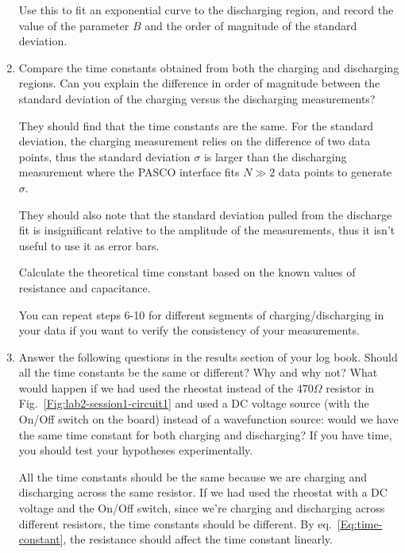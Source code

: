 \documentclass[12pt]{report}
\begin{document}
\begin{enumerate}
Use this to fit an exponential curve to the discharging region, and {\color{blue} record the value of the parameter $B$ and the order of magnitude of the standard deviation}.

\item {\color{blue} Compare the time constants obtained from both the charging and discharging regions. 
Can you explain the difference in order of magnitude between the standard deviation of the charging versus the discharging measurements?
\begin{tcolorbox}[title=Answer]
They should find that the time constants are the same.
For the standard deviation, the charging measurement relies on the difference of two data points, thus the standard deviation $\sigma$ is larger than the discharging measurement where the PASCO interface fits $N \gg 2$ data points to generate $\sigma$.
\end{tcolorbox}
\begin{tcolorbox}
They should also note that the standard deviation pulled from the discharge fit is insignificant relative to the amplitude of the measurements, thus it isn't useful to use it as error bars.
\end{tcolorbox}
Calculate the theoretical time constant based on the known values of resistance and capacitance.} 
You can repeat steps 6-10 for different segments of charging/discharging in your data if you want to verify the consistency of your measurements.

\item {\color{blue}Answer the following questions in the results section of your log book.} Should all the time constants be the same or different? Why and why not? 
What would happen if we had used the rheostat instead of the $470\Omega$ resistor in Fig.~\ref{Fig:lab2-session1-circuit1} and used a DC voltage source (with the On/Off switch on the board) instead of a wavefunction source: would we have the same time constant for both charging and discharging? 
If you have time, you should test your hypotheses experimentally.

\begin{tcolorbox}[title=Answer]
All the time constants should be the same because we are charging and discharging across the same resistor. 
If we had used the rheostat with a DC voltage and the On/Off switch, since we're charging and discharging across different resistors, the time constants should be different. By eq.~\eqref{Eq:time-constant}, the resistance should affect the time constant linearly.
\end{tcolorbox}


\end{enumerate}
\end{document}
